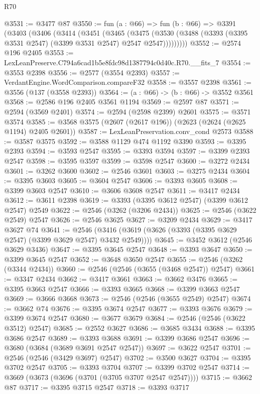 \begin{lexlean}{R70}
\begin{coremodule}
@3531 := @3477 @87
@3550 := fun (a : @66) =>
  fun (b : @66) =>
  @3391
    (@3403
      (@3406
        (@3414
          (@3451
            (@3465
              (@3475
                (@3530 (@3488 (@3393 (@3395 @3531 @2547) (@3399 @3531 @2547) @2547 @2547)))))))))
@3552 := @2574 @196 @2405
@3553 := LexLeanPreserve.C794a6cad1b5e8fdc98d1387794c0d40c.R70.__fits_7
@3554 := @3553 @2398
@3556 := @2577 (@3554 @2393)
@3557 := VerdantEngine.WordComparison.compareF32
@3558 := @3557 @2398
@3561 := @3556 (@137 (@3558 @2393))
@3564 := (a : @66) -> (b : @66) -> @3552 @3561
@3568 := @2586 @196 @2405 @3561 @1194
@3569 := @2597 @87
@3571 := @2594 (@3569 @2401)
@3574 := @2594 (@2598 @2399) @2601
@3575 := @3571 @3574
@3585 := @3568 @3575 (@2607 (@2617 @196)) (@2623 (@2624 (@2625 @1194) @2405 @2601))
@3587 := LexLeanPreservation.conv_cond @2573
@3588 := @3587 @3575
@3592 := @3588 @1129 @474 @1192 @3390
@3593 := @3395 @2393
@3594 := @3593 @2547
@3595 := @3393 @3594
@3597 := @3399 @2393 @2547
@3598 := @3595 @3597
@3599 := @3598 @2547
@3600 := @3272 @2434
@3601 := @3262 @3600
@3602 := @2546 @3601
@3603 := @3275 @2434
@3604 := @3395 @3603
@3605 := @3604 @2547
@3606 := @3393 @3605
@3608 := @3399 @3603 @2547
@3610 := @3606 @3608 @2547
@3611 := @3417 @2434
@3612 := @3611 @2398
@3619 := @3393 (@3395 @3612 @2547) (@3399 @3612 @2547) @2549
@3622 := @2546 (@3262 (@3206 @2434))
@3625 := @2546 (@3622 @2549) @2547
@3626 := @2546 @3625
@3627 := @3209 @2434
@3629 := @3417 @3627 @74
@3641 := @2546 (@3416 (@3619 (@3626 (@3393 (@3395 @3629 @2547) (@3399 @3629 @2547) @3432 @2549))))
@3645 := @3452 @3612 (@2546 @3629 @3436)
@3647 := @3395 @3645 @2547
@3648 := @3393 @3647
@3650 := @3399 @3645 @2547
@3652 := @3648 @3650 @2547
@3655 := @2546 (@3262 (@3344 @2434))
@3660 := @2546 (@2546 (@3655 (@3468 @2547)) @2547)
@3661 := @3347 @2434
@3662 := @3417 @3661
@3663 := @3662 @3476
@3665 := @3395 @3663 @2547
@3666 := @3393 @3665
@3668 := @3399 @3663 @2547
@3669 := @3666 @3668
@3673 := @2546 (@2546 (@3655 @2549) @2547)
@3674 := @3662 @74
@3676 := @3395 @3674 @2547
@3677 := @3393 @3676
@3679 := @3399 @3674 @2547
@3680 := @3677 @3679
@3684 := @2546 (@2546 (@3622 @3512) @2547)
@3685 := @2552 @3627
@3686 := @3685 @3434
@3688 := @3395 @3686 @2547
@3689 := @3393 @3688
@3691 := @3399 @3686 @2547
@3696 := @3680 (@3684 (@3689 @3691 @2547 @2547))
@3697 := @3622 @2547
@3701 := @2546 (@2546 (@3429 @3697) @2547)
@3702 := @3500 @3627
@3704 := @3395 @3702 @2547
@3705 := @3393 @3704
@3707 := @3399 @3702 @2547
@3714 := @3669 (@3673 (@3696 (@3701 (@3705 @3707 @2547 @2547))))
@3715 := @3662 @87
@3717 := @3395 @3715 @2547
@3718 := @3393 @3717

\end{coremodule}
\end{lexlean}
